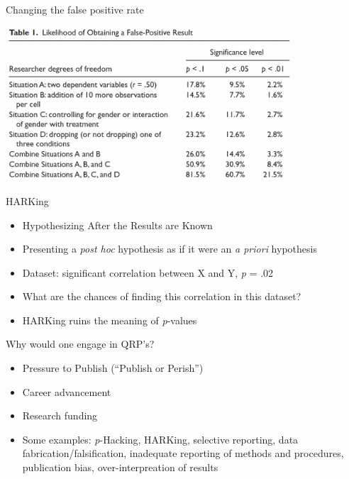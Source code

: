 \documentclass[
  ignorenonframetext,
  aspectratio=169,
]{beamer}
\providecommand{\tightlist}{%
  \setlength{\itemsep}{0pt}\setlength{\parskip}{0pt}}\usepackage{longtable,booktabs,array}
\begin{document}
\begin{frame}{Changing the false positive rate}
\label{changing-the-false-positive-rate}
\begin{center}
\includegraphics[width=0.8\textwidth,height=\textheight]{figs/p-Hacking-table.png}
\end{center}
\end{frame}

\begin{frame}{HARKing}
\label{harking}
\begin{itemize}[<+->]
\tightlist
\item
  Hypothesizing After the Results are Known
\item
  Presenting a \emph{post hoc} hypothesis as if it were an \emph{a
  priori} hypothesis
\item
  Dataset: significant correlation between X and Y, \emph{p} = .02
\item
  What are the chances of finding this correlation in this dataset?
\item
  HARKing ruins the meaning of \emph{p}-values
\end{itemize}
\end{frame}

\begin{frame}{Why would one engage in QRP's?}
\label{why-would-one-engage-in-qrps}
\begin{itemize}[<+->]
\tightlist
\item
  Pressure to Publish (``Publish or Perish'')
\item
  Career advancement
\item
  Research funding
\item
  Some examples: \emph{p}-Hacking, HARKing, selective reporting, data
  fabrication/falsification, inadequate reporting of methods and
  procedures, publication bias, over-interpreation of results
\end{itemize}
\end{frame}
\end{document}
